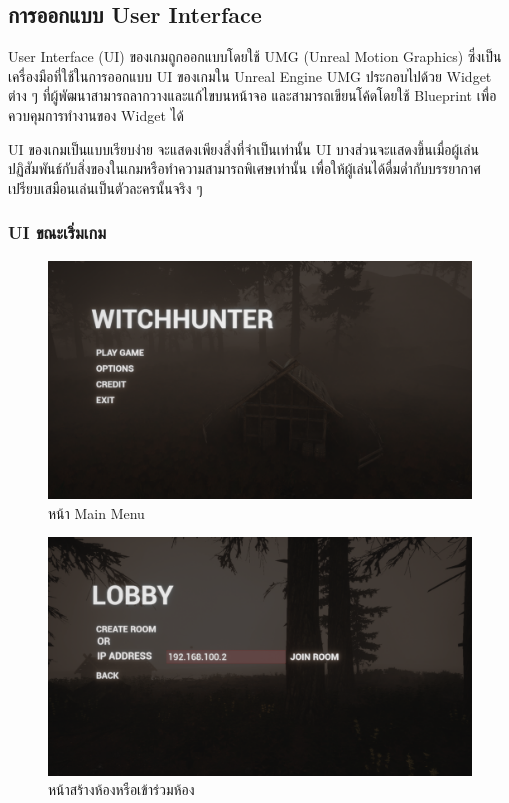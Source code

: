 \subsection{การออกแบบ User Interface}

User Interface (UI) ของเกมถูกออกแบบโดยใช้ UMG (Unreal Motion Graphics) ซึ่งเป็นเครื่องมือที่ใช้ในการออกแบบ UI ของเกมใน Unreal Engine
UMG ประกอบไปด้วย Widget ต่าง ๆ ที่ผู้พัฒนาสามารถลากวางและแก้ไขบนหน้าจอ และสามารถเขียนโค้ดโดยใช้ Blueprint เพื่อควบคุมการทำงานของ Widget ได้

UI ของเกมเป็นแบบเรียบง่าย จะแสดงเพียงสิ่งที่จำเป็นเท่านั้น UI บางส่วนจะแสดงขึ้นเมื่อผู้เล่นปฏิสัมพันธ์กับสิ่งของในเกมหรือทำความสามารถพิเศษเท่านั้น 
เพื่อให้ผู้เล่นได้ดื่มด่ำกับบรรยากาศเปรียบเสมือนเล่นเป็นตัวละครนั้นจริง ๆ

\subsubsection{UI ขณะเริ่มเกม}

\begin{figure}[h]
  \begin{center}
  \includegraphics[width=\textwidth]{./img/UI/mainmenu.png}
  \end{center}
  \caption[หน้า Main Menu]{หน้า Main Menu}
  \label{หน้า Main Menu}
\end{figure}

\pagebreak

\begin{figure}[h!]
  \begin{center}
  \includegraphics[width=\textwidth]{./img/UI/create_room.png}
  \end{center}
  \caption[หน้าสร้างห้องหรือเข้าร่วมห้อง]{หน้าสร้างห้องหรือเข้าร่วมห้อง}
  \label{หน้าสร้างห้องหรือเข้าร่วมห้อง}
\end{figure}

